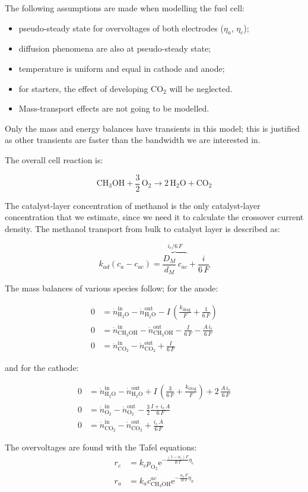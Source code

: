 \documentclass[a4paper]{article}
\newcommand{\e}{\ensuremath{\mathrm{e}}}
\newcommand{\COO}{\ensuremath{\mathrm{CO_2}}}
\newcommand{\OO}{\ensuremath{\mathrm{O_2}}}
\newcommand{\HHO}{\ensuremath{\mathrm{H_2O}}}
\newcommand{\MeOH}{\ensuremath{\mathrm{CH_3OH}}}
\begin{document}
The following assumptions are made when modelling the fuel cell:

\begin{itemize}
\item pseudo-steady state for overvoltages of both electrodes ($\eta_a$,
$\eta_c$);
\item diffusion phenomena are also at pseudo-steady state;
\item temperature is uniform and equal in cathode and anode;
\item for starters, the effect of developing CO$_2$ will be neglected.
\item Mass-transport effects are not going to be modelled.
\end{itemize}

Only the mass and energy balances have transients in this model; this is
justified as other transients are faster than the bandwidth we are interested
in.

The overall cell reaction is:

\begin{equation}
\MeOH + \frac{3}{2}\,\OO \rightarrow 2\,\HHO + \COO
\end{equation}

The catalyst-layer concentration of methanol is the only catalyst-layer
concentration that we estimate, since we need it to calculate the crossover
current density. The methanol transport from bulk to catalyst layer is described
as:

\begin{equation}
k_{ad}(c_a-c_{ac}) = \overbrace{\frac{D_M}{d_M}\,c_{ac}}^{i_c/6\,F}
+ \frac{i}{6\,F}
\end{equation}

The mass balances of various species follow; for the anode:

\begin{align}
0 &= \dot n_\HHO^\text{in} - \dot n_\HHO^\text{out}
- I\,\left(\frac{k_\text{drag}}{F} + \frac{1}{6\,F}\right)\\
0 &= \dot n_\MeOH^\text{in} - \dot n_\MeOH^\text{out} - \frac{I}{6\,F} -
\frac{A\,i_c}{6\,F}\\
0 &= \dot n_\COO^\text{in} - \dot n_\COO^\text{out} + \frac{I}{6\,F}
\end{align}

and for the cathode:

\begin{align}
0 &= \dot n_\HHO^\text{in} - \dot n_\HHO^\text{out} + I\,\left(\frac{3}{6\,F} +
\frac{k_\text{drag}}{F}\right) + 2\,\frac{A\,i_c}{6\,F}\\
0 &= \dot n_\OO^\text{in} - \dot n_\OO^\text{out}
- \frac{3}{2}\frac{I+i_c\,A}{6\,F}\\
0 &= \dot n_\COO^\text{in} - \dot n_\COO^\text{out} + \frac{i_c\,A}{6\,F}
\end{align}

The overvoltages are found with the Tafel equations:
\begin{align}
r_c & = k_c p_\OO \e^{-\frac{(1-\alpha_c)F}{R\,T}\eta_c}\\
r_a & = k_a c_\MeOH^{ac} \e^{-\frac{\alpha_a\,F}{R\,T}\eta_a}
\end{align}
\end{document}
